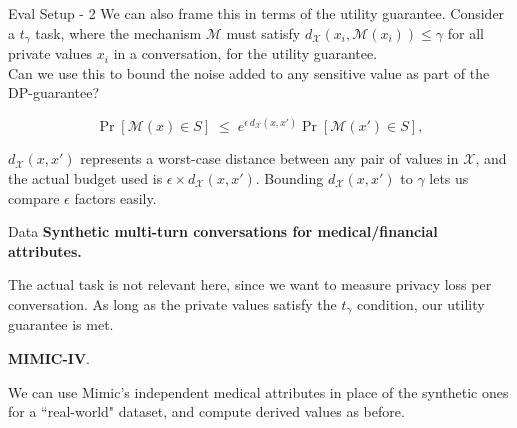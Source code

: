 \documentclass{beamer}
\begin{document}
\begin{frame}{Eval Setup - 2}
    We can also frame this in terms of the utility guarantee. Consider a $t_\gamma$ task, where the mechanism $\mathcal{M}$ must satisfy $d_\mathcal{X}(x_i, \mathcal{M}(x_i)) \le \gamma$ for all private values $x_i$ in a conversation, for the utility guarantee. \\
    \vspace{5mm}
    Can we use this to bound the noise added to any sensitive value as part of the DP-guarantee?

    \[
    \Pr[\mathcal{M}(x) \in S]
    \;\leq\;
    e^{\epsilon \, d_{\mathcal{X}}(x, x')}
    \Pr[\mathcal{M}(x') \in S],
    \]

    $d_{\mathcal{X}}(x, x')$ represents a worst-case distance between any pair of values in $\mathcal{X}$, and the actual budget used is $\epsilon \times d_{\mathcal{X}}(x, x')$. Bounding $ d_{\mathcal{X}}(x, x')$ to $\gamma$ lets us compare $\epsilon$ factors easily.
    
\end{frame}

\begin{frame}{Data}
    \textbf{Synthetic multi-turn conversations for medical/financial attributes.} 
    
    The actual task is not relevant here, since we want to measure privacy loss per conversation. As long as the private values satisfy the $t_\gamma$ condition, our utility guarantee is met. \\
    
    \vspace{5mm}
    
    \textbf{MIMIC-IV}. 
    
    We can use Mimic's independent medical attributes in place of the synthetic ones for a ``real-world" dataset, and compute derived values as before.
    
\end{frame}

\end{document}
